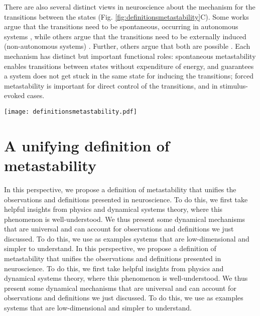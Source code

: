 \documentclass[reprint,onecolumn,superscriptaddress,showpacs,amsmath,amssymb,aps,floatfix]{revtex4-2}
\theoremstyle{definition}
\begin{document}
There are also several distinct views in neuroscience about the mechanism for the transitions between the states (Fig. \ref{fig:definitionsmetastability}C). Some works argue that the transitions need to be spontaneous, occurring in autonomous systems \cite{sasaki2007metastability, kelso2012multistability, roberts2019metastable, fingelkurts2008brainmind, cavanna2018dynamic}, while others argue that the transitions need to be externally induced (non-autonomous systems) \cite{jercog2017updown, hudson2017metastability}. Further, others argue that both are possible \cite{brinkman2022metastable, friston2000transients, lacamera2019cortical}. Each mechanism has distinct but important functional roles: spontaneous metastability enables transitions between states without expenditure of energy, and guarantees a system does not get stuck in the same state \cite{ito2008dynamics} for inducing the transitions; forced metastability is important for direct control of the transitions, and in stimulus-evoked cases. 
%
\begin{figure*}[htb]
    \centering
    \texttt{[image: definitionsmetastability.pdf]}
    \caption{\textbf{Definitions of metastability common in the neuroscience literature.} A common theme among these is the presence of transitions between certain aspects of the system's dynamics (e.g. between activity patterns). The upper part of the figure illustrates what these aspects are in each definition, and the bottom part shows characteristics of the transitions. Further details are available in the main text.}
    \label{fig:definitionsmetastability}
\end{figure*}

\section{A unifying definition of metastability}
In this perspective, we propose a definition of metastability that unifies the observations and definitions presented in neuroscience. To do this, we first take helpful insights from physics and dynamical systems theory, where this phenomenon is well-understood. We thus present some dynamical mechanisms that are universal and can account for observations and definitions we just discussed. To do this, we use as examples systems that are low-dimensional and simpler to understand. 
In this perspective, we propose a definition of metastability that unifies the observations and definitions presented in neuroscience. To do this, we first take helpful insights from physics and dynamical systems theory, where this phenomenon is well-understood. We thus present some dynamical mechanisms that are universal and can account for observations and definitions we just discussed. To do this, we use as examples systems that are low-dimensional and simpler to understand. 
\end{document}
